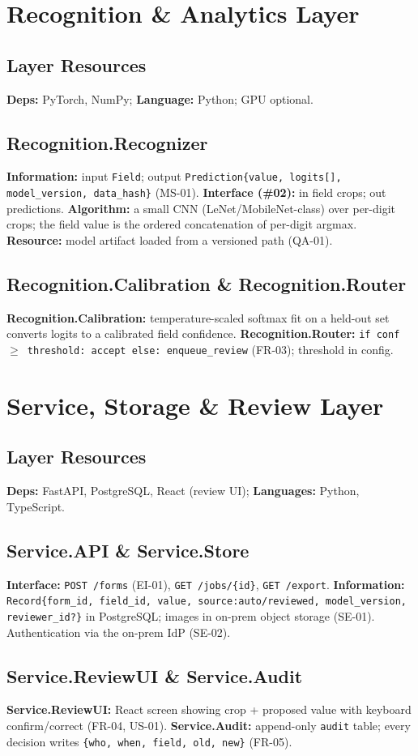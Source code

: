 \documentclass[11pt,letterpaper]{article}
\begin{document}
\section{Recognition \& Analytics Layer}
\subsection{Layer Resources}
\textbf{Deps:} PyTorch, NumPy; \textbf{Language:} Python; GPU optional.
\subsection{Recognition.Recognizer}
\textbf{Information:} input \texttt{Field}; output
\texttt{Prediction\{value, logits[], model\_version, data\_hash\}} (MS-01).
\textbf{Interface (\#02):} in field crops; out predictions.
\textbf{Algorithm:} a small CNN (LeNet/MobileNet-class) over per-digit crops; the
field value is the ordered concatenation of per-digit argmax. \textbf{Resource:}
model artifact loaded from a versioned path (QA-01).
\subsection{Recognition.Calibration \& Recognition.Router}
\textbf{Recognition.Calibration:} temperature-scaled softmax fit on a held-out set converts
logits to a calibrated field confidence. \textbf{Recognition.Router:} \texttt{if conf $\geq$
threshold: accept else: enqueue\_review} (FR-03); threshold in config.

\section{Service, Storage \& Review Layer}
\subsection{Layer Resources}
\textbf{Deps:} FastAPI, PostgreSQL, React (review UI); \textbf{Languages:} Python,
TypeScript.
\subsection{Service.API \& Service.Store}
\textbf{Interface:} \texttt{POST /forms} (EI-01), \texttt{GET /jobs/\{id\}},
\texttt{GET /export}. \textbf{Information:} \texttt{Record\{form\_id, field\_id,
value, source:auto/reviewed, model\_version, reviewer\_id?\}} in PostgreSQL;
images in on-prem object storage (SE-01). Authentication via the on-prem IdP (SE-02).
\subsection{Service.ReviewUI \& Service.Audit}
\textbf{Service.ReviewUI:} React screen showing crop + proposed value with keyboard
confirm/correct (FR-04, US-01). \textbf{Service.Audit:} append-only \texttt{audit} table;
every decision writes \texttt{\{who, when, field, old, new\}} (FR-05).
\end{document}
